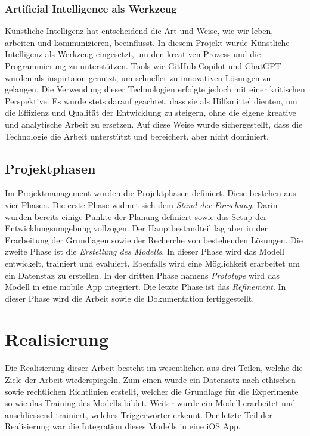 \documentclass[11pt,a4paper]{article}
\begin{document}
\subsubsection{Artificial Intelligence als Werkzeug}
Künstliche Intelligenz hat entscheidend die Art und Weise, wie wir leben, arbeiten und 
kommunizieren, beeinflusst. In diesem Projekt wurde Künstliche Intelligenz als Werkzeug eingesetzt, 
um den kreativen Prozess und die Programmierung zu unterstützen. Tools wie GitHub Copilot und 
ChatGPT wurden als inspirtaion genutzt, um schneller zu innovativen Lösungen zu 
gelangen. Die Verwendung dieser Technologien erfolgte jedoch mit einer kritischen Perspektive. Es 
wurde stets darauf geachtet, dass sie als Hilfsmittel dienten, um die Effizienz und Qualität der 
Entwicklung zu steigern, ohne die eigene kreative und analytische Arbeit zu ersetzen. Auf diese 
Weise wurde sichergestellt, dass die Technologie die Arbeit unterstützt und bereichert, aber nicht 
dominiert.


\subsection{Projektphasen}
Im Projektmanagement wurden die Projektphasen definiert. Diese bestehen aus vier Phasen. Die erste
Phase widmet sich dem \textit{Stand der Forschung}. Darin wurden bereits einige Punkte der 
Planung definiert sowie das Setup der Entwicklungsumgebung vollzogen. Der Hauptbestandteil lag aber in der 
Erarbeitung der Grundlagen sowie der Recherche von bestehenden Lösungen. Die zweite Phase ist die 
\textit{Erstellung des Modells}. In dieser Phase wird das Modell entwickelt, trainiert und 
evaluiert. Ebenfalls wird eine Möglichkeit erarbeitet um ein Datenstaz zu erstellen. In der 
dritten Phase namens \textit{Prototype} wird das Modell in eine mobile App integriert. 
Die letzte Phase ist das \textit{Refinement}. In dieser Phase wird die Arbeit sowie die
Dokumentation fertiggestellt. 


\newpage \section{Realisierung}
Die Realisierung dieser Arbeit besteht im wesentlichen aus drei Teilen, welche die Ziele der Arbeit 
wiederspiegeln. Zum einen wurde ein Datensatz nach ethischen sowie rechtlichen Richtlinien erstellt, 
welcher die Grundlage für die Experimente so wie das Training des Modells bildet. Weiter wurde ein 
Modell erarbeitet und anschliessend trainiert, welches Triggerwörter erkennt. Der letzte Teil der 
Realisierung war die Integration dieses Modells in eine iOS App.
\end{document}
